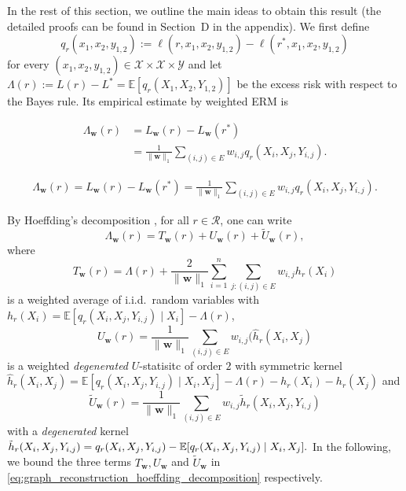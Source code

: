 \documentclass[letterpaper]{article} %
\def\DoubleColumn{}
\def\DoubleColumnEnd{}
\def\SingleColumn{}
\def\SingleColumnEnd{}
\newcommand{\E}{\mathbb{E}}
\newcommand{\weight}{\mathbf{w}}
\newcommand{\yspace}{\mathcal{Y}}
\newcommand{\bayeserror}{L^*}
\newcommand{\empiricalrisk}[1]{L_{#1}}
\newcommand{\risk}{L}
\newcommand{\lossf}{\ell}
\newcommand{\pair}[1]{(#1)}
\newcommand{\normo}[1]{\|#1\|_1}
\begin{document}
In the rest of this section, we outline the main ideas to obtain this result (the detailed proofs can be found in Section~D in the 
appendix).
We first define
\[q_r(x_1,x_2,y_{1,2}):=\lossf(r, x_1,x_2,y_{1,2})-\lossf(r^*,x_1,x_2,y_{1,2})\]
for every $(x_1,x_2,y_{1,2})\in \mathcal X\times\mathcal X\times\yspace{}$ and let $\Lambda(r) := \risk(r)-\bayeserror=\E[q_r(X_1,X_2,Y_{1,2})]$
be the excess risk with respect to the Bayes rule.
Its empirical estimate by weighted ERM is 
\DoubleColumn
\begin{align*}
    \Lambda_\weight{}(r) &= \empiricalrisk{\weight{}}(r)-\empiricalrisk{\weight{}}(r^*)\\
    &=\frac{1}{\normo{\weight{}}}\sum_{\pair{i,j}\in E} w_{i,j} q_r(X_i,X_j,Y_{i,j}).
\end{align*}
\DoubleColumnEnd
\SingleColumn
\begin{align*}
    \Lambda_\weight{}(r) = \empiricalrisk{\weight{}}(r)-\empiricalrisk{\weight{}}(r^*)=\frac{1}{\normo{\weight{}}}\sum_{\pair{i,j}\in E} w_{i,j} q_r(X_i,X_j,Y_{i,j}).
\end{align*}
\SingleColumnEnd

By Hoeffding's decomposition \cite{hoeffding1948class}, for all $r\in\mathcal R$, one can write
\begin{equation}
    \label{eq:graph_reconstruction_hoeffding_decomposition}
    \Lambda_\weight{}(r) = T_\weight{}(r) + U_\weight{}(r) + \widetilde{U}_\weight{}(r),
\end{equation}
where
\[T_\weight{}(r)=\Lambda(r)+\frac{2}{\normo{\weight{}}}\sum_{i=1}^n\sum_{j:\pair{i,j}\in E}w_{i,j}h_r(X_i)\]
is a weighted average of i.i.d.\ random variables with $h_r(X_i)=\E[q_r(X_i,X_j,Y_{i,j})\mid X_i]-\Lambda(r)$,
\[U_\weight{}(r)=\frac{1}{\normo{\weight{}}}\sum_{\pair{i,j}\in E} w_{i,j}(\hat{h}_r(X_i,X_j)\]
is a weighted \emph{degenerated} $U$-statisitc of order $2$ with symmetric kernel 
$\hat{h}_r(X_i,X_j)=\E[q_r(X_i,X_j,Y_{i,j})\mid X_i,X_j]-\Lambda(r)-h_r(X_i)-h_r(X_j)$ 
and
\[\widetilde{U}_\weight{}(r)=\frac{1}{\normo{\weight{}}}\sum_{\pair{i,j}\in E}w_{i,j}\tilde{h}_r(X_i,X_j,Y_{i,j})\]
with a \emph{degenerated} kernel
$\tilde{h}_r(X_i,X_j,Y_{i,j})=q_r(X_i,X_j\linebreak,Y_{i,j})-\E[q_r(X_i,X_j,Y_{i,j})\mid X_i,X_j].$ 
In the following, we bound the three terms $T_\weight{}, U_\weight{}$ and $\widetilde{U}_\weight{}$ in \eqref{eq:graph_reconstruction_hoeffding_decomposition} respectively. 

\end{document}
